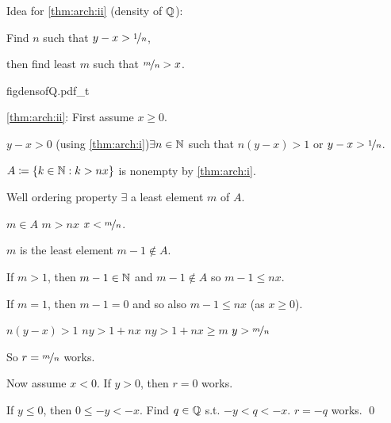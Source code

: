 \documentclass[10pt,aspectratio=169]{beamer}
\begin{document}
\begin{frame}
Idea for \eqref{thm:arch:ii} (density of ${\mathbb{Q}}$):

\medskip

Find $n$ such that $y-x > \nicefrac{1}{n}$,

\medskip

then find least $m$ such that $\nicefrac{m}{n} > x$.

\vspace*{-0.5in}
\hspace*{2.0in}%
{figdensofQ.pdf_t}

\vspace*{-0.3in}
\pause

\eqref{thm:arch:ii}:
First assume $x \geq 0$.

\medskip
\pause

$y-x > 0$ \quad (using \eqref{thm:arch:i})\thus \quad $\exists n \in {\mathbb{N}}$ such that
\quad
$n(y-x) > 1$
\quad or \quad
$y-x > \nicefrac{1}{n}$.

\medskip
\pause

$A \coloneqq \{ k \in {\mathbb{N}} : k > nx \}$ is nonempty by \eqref{thm:arch:i}.

\medskip
\pause

Well ordering property \wthus $\exists$ a least element $m$ of $A$.

\medskip
\pause

$m \in A$ \wthus $m > nx$ \wthus $x < \nicefrac{m}{n}$.

\medskip
\pause

$m$ is the least element \wthus $m-1 \notin A$.

\medskip
\pause

If $m > 1$, then $m-1 \in {\mathbb{N}}$ and $m-1 \notin A$ so \quad $m-1 \leq nx$.

\pause

If $m = 1$, then $m-1 = 0$ and so also \quad $m-1 \leq nx$ \quad (as $x \geq 0$).

%

\medskip
\pause

$n(y-x) > 1$ \wthus $ny > 1+nx$
\pause
\wthus
$ny > 1+nx \geq m$
\pause
\wthus
$y > \nicefrac{m}{n}$
\pause

So $r=\nicefrac{m}{n}$ works.

\medskip
\pause

Now assume $x < 0$.  \qquad\pause  If $y > 0$, then $r=0$ works.

\medskip
\pause

If $y \leq 0$, then $0 \leq -y < -x$.
\quad \pause
Find $q\in {\mathbb{Q}}$ s.t. $-y < q < -x$.
\quad \pause  $r = -q$ works.
\qed

\end{frame}
\end{document}

